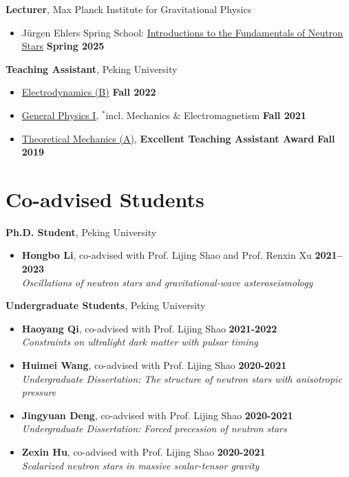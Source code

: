 \documentclass[margin,line]{res}
\begin{document}
\begin{resume}
{\bf Lecturer}, Max Planck Institute for Gravitational Physics 
\vspace*{.05in}
\begin{itemize}
  \item[ ] Jürgen Ehlers Spring School: \href{https://springschool.aei.mpg.de/}{Introductions to the Fundamentals of Neutron Stars} \hfill {\bf Spring 2025}
\end{itemize}


{\bf Teaching Assistant}, Peking University
\vspace*{.05in}
\begin{itemize}
  \item[ ] \href{http://friendshao.github.io/teaching/ced22/}{Electrodynamics (B)} \hfill {\bf Fall 2022}
\item[ ] \href{http://friendshao.github.io/teaching/phy21/}{General Physics I}, $^{*}${\small incl. Mechanics $\&$ Electromagnetism} \hfill {\bf Fall 2021}
\item[ ] \href{http://friendshao.github.io/teaching/thmech19/}{Theoretical Mechanics (A)}, {\small{\bf Excellent Teaching Assistant Award}} \hfill {\bf Fall 2019}
\end{itemize}

\section{\sc Co-advised Students}

{\bf Ph.D. Student}, Peking University
\vspace*{.05in}
\begin{itemize}
\item[] {\bf Hongbo Li}, co-advised with Prof. Lijing Shao and Prof. Renxin Xu 
\hfill {\bf 2021--2023} \\
\vspace*{.05in}
{\it  Oscillations of neutron stars and gravitational-wave asteroseismology}
\end{itemize}
{\bf Undergraduate Students}, Peking University
\vspace*{.05in}
\begin{itemize}
\item[] {\bf Haoyang Qi}, co-advised with Prof. Lijing Shao
\hfill {\bf 2021-2022}\\
{\it Constraints on ultralight dark matter with pulsar timing}
\item[] {\bf Huimei Wang}, co-advised with Prof. Lijing Shao 
\hfill {\bf 2020-2021}\\
{\it Undergraduate Dissertation: The structure of neutron stars with anisotropic pressure}
\item[] {\bf Jingyuan Deng}, co-advised with Prof. Lijing Shao 
\hfill {\bf 2020-2021}\\
{\it Undergraduate Dissertation: Forced precession of neutron stars}
\item[] {\bf Zexin Hu}, co-advised with Prof. Lijing Shao
\hfill {\bf 2020-2021}\\
{\it Scalarized neutron stars in massive scalar-tensor gravity}
\end{itemize}


\end{resume}
\end{document}
